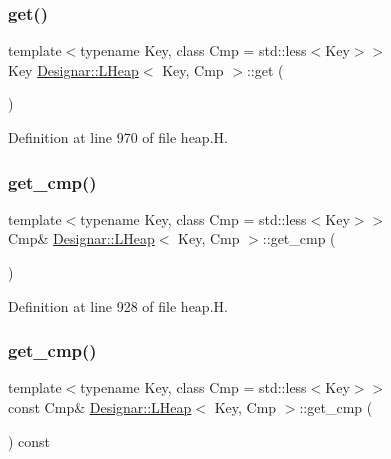 \subsubsection{\texorpdfstring{get()}{get()}}
{\footnotesize\ttfamily template$<$typename Key, class Cmp = std\+::less$<$\+Key$>$$>$ \\
Key \hyperlink{class_designar_1_1_l_heap}{Designar\+::\+L\+Heap}$<$ Key, Cmp $>$\+::get (\begin{DoxyParamCaption}{ }\end{DoxyParamCaption})\hspace{0.3cm}{\ttfamily [inline]}}



Definition at line 970 of file heap.\+H.

\mbox{\label{class_designar_1_1_l_heap_a2c704057a03ec82052cf916142709506}} 
\subsubsection{\texorpdfstring{get\+\_\+cmp()}{get\_cmp()}\hspace{0.1cm}{\footnotesize\ttfamily [1/2]}}
{\footnotesize\ttfamily template$<$typename Key, class Cmp = std\+::less$<$\+Key$>$$>$ \\
Cmp\& \hyperlink{class_designar_1_1_l_heap}{Designar\+::\+L\+Heap}$<$ Key, Cmp $>$\+::get\+\_\+cmp (\begin{DoxyParamCaption}{ }\end{DoxyParamCaption})\hspace{0.3cm}{\ttfamily [inline]}}



Definition at line 928 of file heap.\+H.

\mbox{\label{class_designar_1_1_l_heap_a2cb81067a531983f16aba240cd2dcde5}} 
\subsubsection{\texorpdfstring{get\+\_\+cmp()}{get\_cmp()}\hspace{0.1cm}{\footnotesize\ttfamily [2/2]}}
{\footnotesize\ttfamily template$<$typename Key, class Cmp = std\+::less$<$\+Key$>$$>$ \\
const Cmp\& \hyperlink{class_designar_1_1_l_heap}{Designar\+::\+L\+Heap}$<$ Key, Cmp $>$\+::get\+\_\+cmp (\begin{DoxyParamCaption}{ }\end{DoxyParamCaption}) const\hspace{0.3cm}{\ttfamily [inline]}}



